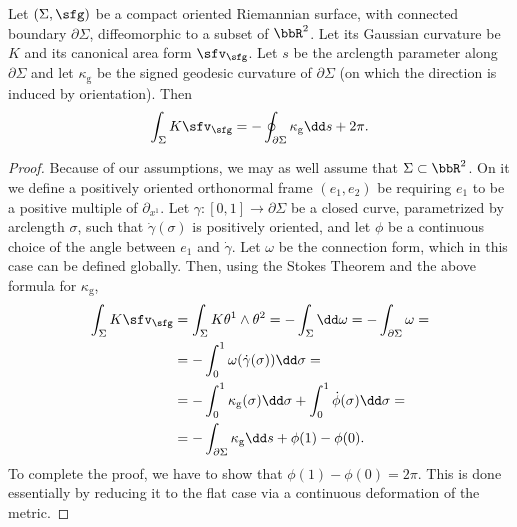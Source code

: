 \begin{prop}
    Let $(\Sigma,\sfg)$ be a compact oriented Riemannian surface, with connected boundary $\partial \Sigma$, diffeomorphic to a subset of $\bbR^2$. Let its Gaussian curvature be $K$ and its canonical area form $\sfv_\sfg$. Let $s$ be the arclength parameter along $\partial \Sigma$ and let $\kappa_{\mathrm{g}}$ be the signed geodesic curvature of $\partial \Sigma$ (on which the direction is induced by orientation). Then 
    \[\int_\Sigma K\sfv_\sfg=-\oint_{\partial \Sigma}\kappa_{\mathrm{g}}\dd s+2\pi.\]
\end{prop}
\begin{proof}
    Because of our assumptions, we may as well assume that $\Sigma\subset \bbR^2$. On it we define a positively oriented orthonormal frame $(e_1,e_2)$ be requiring $e_1$ to be a positive multiple of $\partial_{x^1}$. Let $\gamma:[0,1]\to \partial \Sigma$ be a closed curve, parametrized by arclength $\sigma$, such that $\dot\gamma(\sigma)$ is positively oriented, and let $\phi$ be a continuous choice of the angle between $e_1$ and $\dot\gamma$. Let $\omega$ be the connection form, which in this case can be defined globally. Then, using the Stokes Theorem and the above formula for $\kappa_{\mathrm{g}}$,
    \begin{align}
        \int_\Sigma K\sfv_\sfg&=\int_\Sigma K\theta^1\wedge\theta^2=-\int_\Sigma \dd \omega=-\int_{\partial \Sigma}\omega=\\
        &=-\int_0^1 \omega(\dot\gamma(\sigma))\dd \sigma=\\
        &=-\int_0^1\kappa_{\mathrm{g}}(\sigma)\dd\sigma+\int_0^1\dot\phi(\sigma)\dd\sigma=\\
        &=-\int_{\partial \Sigma}\kappa_{\mathrm{g}}\dd s+\phi(1)-\phi(0).
    \end{align}
    To complete the proof, we have to show that $\phi(1)-\phi(0)=2\pi$. This is done essentially by reducing it to the flat case via a continuous deformation of the metric.


\end{proof}
